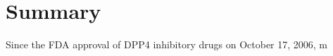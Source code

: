 \section{\label{chap:Sum} Summary}
Since the FDA approval of DPP4 inhibitory drugs on October 17, 2006, m
